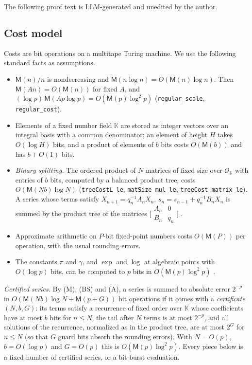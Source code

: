\documentclass[11pt,reqno]{amsart}
\theoremstyle{definition}
\theoremstyle{remark}
\newcommand{\Mul}{\mathsf{M}}
\begin{document}
The following proof text is LLM-generated and unedited by the author.

\begin{small}

\subsection{Cost model}\label{app:tools}
Costs are bit operations on a multitape Turing machine. We use the following standard facts as assumptions.
\begin{itemize}
\item[(M)] $\Mul(n)/n$ is nondecreasing and $\Mul(n\log n) = O(\Mul(n)\log n)$. Then $\Mul(An) = O(\Mul(n))$ for fixed
$A$, and $(\log p)\,\Mul(Ap\log p) = O(\Mul(p)\log^2p)$ (\nolinkurl{regular_scale}, \nolinkurl{regular_cost}).
\item[(K)] Elements of a fixed number field $\mathbb K$ are stored as integer vectors over an integral basis with a
common denominator; an element of height $H$ takes $O(\log H)$ bits, and a product of elements of $b$ bits costs
$O(\Mul(b))$ and has $b + O(1)$ bits.
\item[(BS)] \emph{Binary splitting.} The ordered product of $N$ matrices of fixed size over $\mathcal O_{\mathbb K}$
with entries of $b$ bits, computed by a balanced product tree, costs $O(\Mul(Nb)\log N)$
(\nolinkurl{treeCostL_le}, \nolinkurl{matSize_mul_le}, \nolinkurl{treeCost_matrix_le}). A series whose terms satisfy
$X_{n+1} = q_n^{-1}A_nX_n$, $s_n = s_{n-1} + q_n^{-1}B_nX_n$ is summed by the product tree of the matrices
$\bigl[\begin{smallmatrix}A_n & 0\\ B_n & q_n\end{smallmatrix}\bigr]$ \cite{HP98}.
\item[(A)] Approximate arithmetic on $P$-bit fixed-point numbers costs $O(\Mul(P))$ per operation, with the usual
rounding errors.
\item[(E)] The constants $\pi$ and $\gamma$, and $\exp$ and $\log$ at algebraic points with $O(\log p)$ bits, can be
computed to $p$ bits in $O(\Mul(p)\log^2p)$ \cite{BM80,HP98,BZ10}.
\end{itemize}

\emph{Certified series.} By (M), (BS) and (A), a series is summed to absolute error $2^{-p}$ in
$O(\Mul(Nb)\log N + \Mul(p+G))$ bit operations if it comes with a \emph{certificate} $(N, b, G)$: its terms satisfy a
recurrence of fixed order over $\mathbb K$ whose coefficients have at most $b$ bits for $n \le N$, the tail after $N$
terms is at most $2^{-p}$, and all solutions of the recurrence, normalized as in the product tree, are at most $2^G$
for $n \le N$ (so that $G$ guard bits absorb the rounding errors). With $N = O(p)$, $b = O(\log p)$ and $G = O(p)$
this is $O(\Mul(p)\log^2p)$. Every piece below is a fixed number of certified series, or a bit-burst evaluation.


\end{small}
\end{document}
